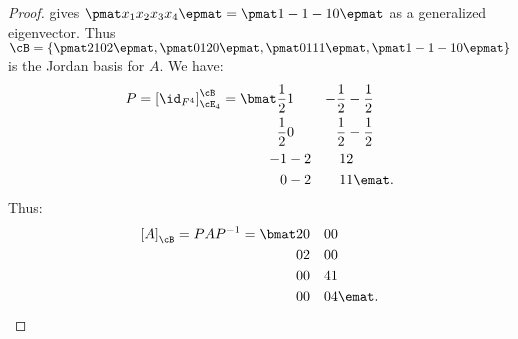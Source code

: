\documentclass[10pt,twoside,openany]{memoir}
\begin{document}
\begin{proof}
                gives $\pmat x_1 \\ x_2 \\ x_3 \\ x_4 \epmat = \pmat 1 \\ -1 \\ -1 \\ 0\epmat$ as a generalized eigenvector. Thus $\cB = \left\{\pmat 2 \\ 1\\0\\2\epmat, \pmat 0 \\ 1\\2\\0\epmat, \pmat 0 \\ 1 \\ 1 \\ 1 \epmat, \pmat 1 \\ -1 \\ -1 \\ 0\epmat \right\}$ is the Jordan basis for $A$. We have:
                    \begin{equation*}
                    \begin{split}
                        P = \left[\id_{F^4}\right]_{\cE_4}^{\cB} = 
                        \bmat 
                        \frac{1}{2} & 1 & -\frac{1}{2} & -\frac{1}{2} \\
                        \frac{1}{2} & 0 & \frac{1}{2} & -\frac{1}{2} \\
                        -1 & -2 & 1 & 2 \\
                        0 & -2 & 1 & 1 
                        \emat.
                    \end{split}
                    \end{equation*}
                Thus:
                    \begin{equation*}
                    \begin{split}
                        \left[A\right]_\cB= PAP^{-1} = 
                        \bmat
                        2 & 0 & 0 & 0 \\
                        0 & 2 & 0 & 0 \\
                        0 & 0 & 4 & 1 \\
                        0 & 0 & 0 & 4
                        \emat. \qedhere
                    \end{split}
                    \end{equation*}
            \end{proof}
\end{document}
